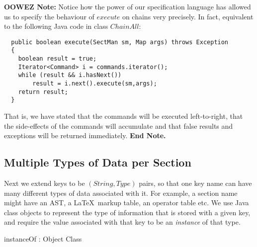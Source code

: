 \documentclass{llncs} %
\newenvironment{OOWEZ}{\textbf{OOWEZ Note: }}{\textbf{End Note.}}
\begin{document}
\begin{OOWEZ}
  Notice how the power of our specification language has allowed
  us to specify the behaviour of $execute$ on chains very precisely.
  In fact, equivalent to the following Java code in class $ChainAll$:
\begin{verbatim}
  public boolean execute(SectMan sm, Map args) throws Exception
  {
    boolean result = true;
    Iterator<Command> i = commands.iterator();
    while (result && i.hasNext())
        result = i.next().execute(sm,args);
    return result;
  }
\end{verbatim}
  That is, we have stated that the commands will be executed left-to-right, 
  that the side-effects of the commands will accumulate and 
  that false results and exceptions will be returned immediately.
\end{OOWEZ}



\subsection{Multiple Types of Data per Section}

Next we extend keys to be $(String,Type)$ pairs, so that
one key name can have many different types of data associated with it.
For example, a section name might have an AST, a \LaTeX\ markup
table, an operator table etc.  We use Java class objects to
represent the type of information that is stored with a given key, 
and require the value associated with that key to be an \emph{instance}
of that type.

\begin{zed}
\end{zed}

\begin{axdef}
  instanceOf : Object \rel Class
\end{axdef}
\end{document}
